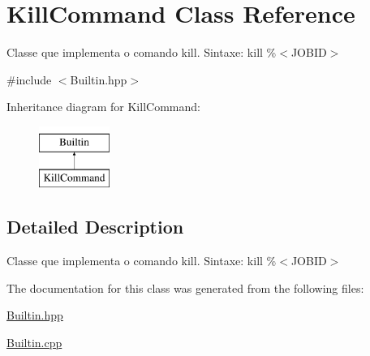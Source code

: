 \hypertarget{classKillCommand}{
\section{KillCommand Class Reference}
\label{classKillCommand}
}


Classe que implementa o comando kill. Sintaxe: kill \%$<$JOBID$>$  




{\ttfamily \#include $<$Builtin.hpp$>$}

Inheritance diagram for KillCommand:\begin{figure}[H]
\begin{center}
\leavevmode
\includegraphics[height=2.000000cm]{classKillCommand}
\end{center}
\end{figure}


\subsection{Detailed Description}
Classe que implementa o comando kill. Sintaxe: kill \%$<$JOBID$>$ 

The documentation for this class was generated from the following files:\begin{DoxyCompactItemize}
\item 
\hyperlink{Builtin_8hpp}{Builtin.hpp}\item 
\hyperlink{Builtin_8cpp}{Builtin.cpp}\end{DoxyCompactItemize}
